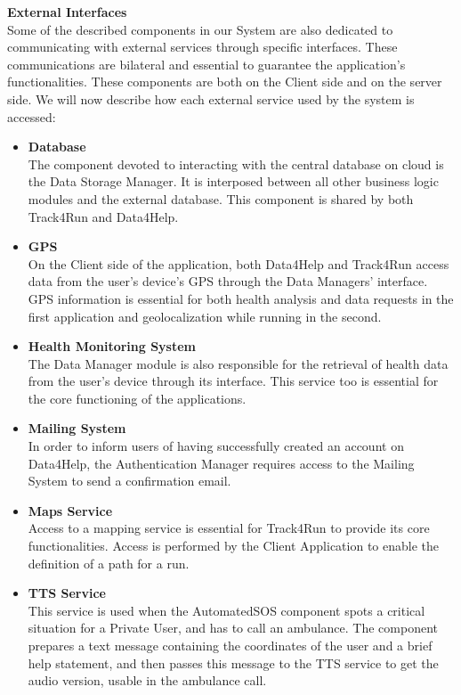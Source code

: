 \documentclass[titlepage]{article}
\begin{document}
{\bf External Interfaces }\\ 
Some of the described components in our System are also dedicated to communicating with external services through specific interfaces. These communications are bilateral and essential to guarantee the application’s functionalities. These components are both on the Client side and on the server side. We will now describe how each external service used by the system is accessed:
\begin{itemize}
        \item {\bf Database }\\
        The component devoted to interacting with the central database on cloud is the Data Storage Manager. It is interposed between all other business logic modules and the external database. This component is shared by both Track4Run and Data4Help.
		\item {\bf GPS }\\
		On the Client side of the application, both Data4Help and Track4Run access data from the user’s device’s GPS through the Data Managers’ interface. GPS information is essential for both health analysis and data requests in the first application and geolocalization while running in the second.
		\item {\bf Health Monitoring System }\\
		The Data Manager module is also responsible for the retrieval of health data from the user’s device through its interface. This service too is essential for the core functioning of the applications.
		\item {\bf Mailing System }\\
		In order to inform users of having successfully created an account on Data4Help, the Authentication Manager requires access to the Mailing System to send a confirmation email.
		\item {\bf Maps Service }\\
		Access to a mapping service is essential for Track4Run to provide its core functionalities. Access is performed by the Client Application to enable the definition of a path for a run.
		\item {\bf TTS Service }\\
		This service is used when the AutomatedSOS component spots a critical situation for a Private User, and has to call an ambulance. The component prepares a text message containing the coordinates of the user and a brief help statement, and then passes this message to the TTS service to get the audio version, usable in the ambulance call.
    \end{itemize} 
\end{document}
